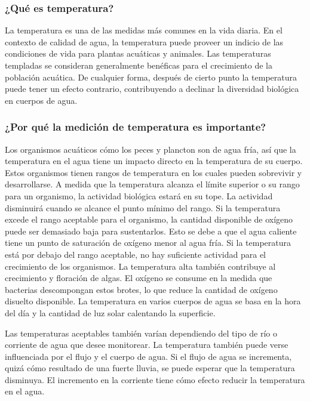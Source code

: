\subsubsection{¿Qué es temperatura?}
La temperatura es una de las medidas más comunes en la vida diaria. 
En el contexto de calidad de agua, la temperatura puede proveer un indicio de las condiciones de vida para plantas acu\'aticas y animales.  
Las temperaturas templadas se consideran generalmente ben\'eficas para el crecimiento de la poblaci\'on acu\'atica. 
De cualquier forma, despu\'es de cierto punto la temperatura puede tener un efecto contrario, contribuyendo a declinar la diversidad biol\'ogica en cuerpos de agua.

\subsubsection{¿Por qu\'e la medición de temperatura es importante?}
Los organismos acu\'aticos c\'omo los peces y plancton son de agua fr\'ia, as\'i que la temperatura en el agua tiene un impacto directo en la temperatura de su cuerpo. 
Estos organismos tienen rangos de temperatura en los cuales pueden sobrevivir y desarrollarse. 
A medida que la temperatura alcanza el l\'imite superior o su rango para un organismo, la actividad biol\'ogica estar\'a en su tope. 
La actividad disminuir\'a cuando se alcance el punto mínimo del rango. 
Si la temperatura excede el rango aceptable para el organismo, la cantidad disponible de ox\'igeno puede ser demasiado baja para sustentarlos. 
Esto se debe a que el agua caliente tiene un punto de saturaci\'on de ox\'igeno menor al agua fr\'ia. 
Si la temperatura est\'a por debajo del rango aceptable, no hay suficiente actividad para el crecimiento de los organismos. 
La temperatura alta tambi\'en contribuye al crecimiento y floración de algas\cite{cruzado_campos_aplicacion_2021}.
El oxígeno se consume en la medida que bacterias descompongan estos brotes, lo que reduce la cantidad de oxígeno disuelto disponible.
La temperatura en varios cuerpos de agua se basa en la hora del día y la cantidad de luz solar calentando la superficie.

Las temperaturas aceptables tambi\'en var\'ian dependiendo del tipo de r\'io o corriente de agua que desee monitorear. 
La temperatura tambi\'en puede verse influenciada por el flujo y el cuerpo de agua. 
Si el flujo de agua se incrementa, quiz\'a c\'omo resultado de una fuerte lluvia, se puede esperar que la temperatura disminuya. 
El incremento en la corriente tiene c\'omo efecto reducir la temperatura en el agua.

